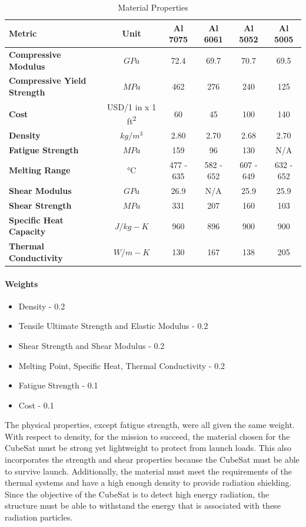 \begin{table}[H]
\centering
\begin{tabular}{|l|c|c|c|c|c|} 
\hline
    \textbf{Metric} & \textbf{Unit} & \textbf{Al 7075} & \textbf{Al 6061} & \textbf{Al 5052} & \textbf{Al 5005}
    \\
\hline
    \textbf{Compressive Modulus} & $GPa$ & 72.4 & 69.7 & 70.7 & 69.5
    \\
\hline
    \textbf{Compressive Yield Strength} & $MPa$ & 462 & 276 & 240 & 125
    \\
\hline
    \textbf{Cost} & USD/1 in x 1 ft\textsuperscript{2}  & 60 & 45 & 100 &  140
    \\
\hline
    \textbf{Density} & $kg/m^3$ & 2.80 & 2.70 & 2.68 & 2.70
    \\
\hline
    \textbf{Fatigue Strength} & $MPa$ & 159 & 96 & 130 & N/A 
    \\
\hline
    \textbf{Melting Range} & °C & 477 - 635 & 582 - 652 & 607 - 649 & 632 - 652
    \\
\hline
    \textbf{Shear Modulus} & $GPa$ & 26.9 & N/A & 25.9 & 25.9 
    \\
\hline
    \textbf{Shear Strength} & $MPa$ & 331 & 207 & 160 & 103
    \\
\hline
    \textbf{Specific Heat Capacity} & $J/{kg-K}$ & 960 & 896 & 900 & 900
    \\
\hline
    \textbf{Thermal Conductivity} & $W/{m-K}$ & 130 & 167 & 138 & 205 
    \\

\hline
\end{tabular}
\caption{Material Properties\cite{ASM}\cite{mwsaa}}
\label{tbl:material_Props}
\end{table}

\paragraph{Weights}
\begin{itemize}
    \item Density - 0.2
    \item Tensile Ultimate Strength and Elastic Modulus - 0.2
    \item Shear Strength and Shear Modulus - 0.2
    \item Melting Point, Specific Heat, Thermal Conductivity - 0.2
    \item Fatigue Strength - 0.1
    \item Cost - 0.1
\end{itemize}
\bigskip
The physical properties, except fatigue strength, were all given the same weight. With respect to density, for the mission to succeed, the material chosen for the CubeSat must be strong yet lightweight to protect from launch loads. This also incorporates the strength and shear properties because the CubeSat must be able to survive launch. Additionally, the material must meet the requirements of the thermal systems and have a high enough density to provide radiation shielding. Since the objective of the CubeSat is to detect high energy radiation, the structure must be able to withstand the energy that is associated with these radiation particles. 
\bigskip

